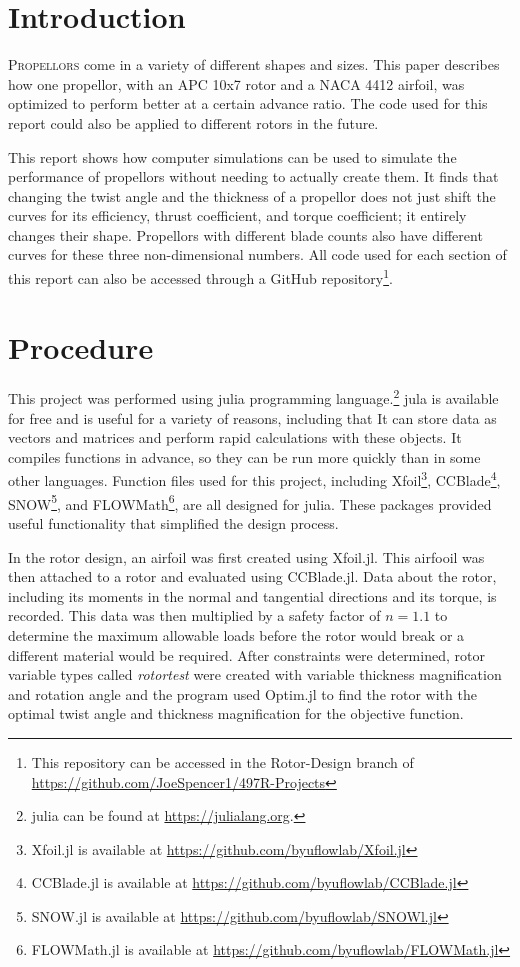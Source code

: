 \documentclass[journal ]{new-aiaa}
\begin{document}
\section{Introduction}

\lettrine{P}{ropellors} come in a variety of different shapes and sizes. This paper describes how one propellor, with an APC 10x7 rotor and a NACA 4412 airfoil, was optimized to perform better at a certain advance ratio. The code used for this report could also be applied to different rotors in the future.

This report shows how computer simulations can be used to simulate the performance of propellors without needing to actually create them. It finds that changing the twist angle and the thickness of a propellor does not just shift the curves for its efficiency, thrust coefficient, and torque coefficient; it entirely changes their shape. Propellors with different blade counts also have different curves for these three non-dimensional numbers. All code used for each section of this report can also be accessed through a GitHub repository\footnote{This repository can be accessed in the Rotor-Design branch of \url{https://github.com/JoeSpencer1/497R-Projects}}.


\section{Procedure}

This project was performed using julia programming language.\footnote{julia can be found at \url{https://julialang.org}.} jula is available for free and is useful for a variety of reasons, including that It can store data as vectors and matrices and perform rapid calculations with these objects. It compiles functions in advance, so they can be run more quickly than in some other languages. Function files used for this project, including Xfoil\footnote{Xfoil.jl is available at \url{https://github.com/byuflowlab/Xfoil.jl}}, CCBlade\footnote{CCBlade.jl is available at \url{https://github.com/byuflowlab/CCBlade.jl}}, SNOW\footnote{SNOW.jl is available at \url{https://github.com/byuflowlab/SNOWl.jl}}, and FLOWMath\footnote{FLOWMath.jl is available at \url{https://github.com/byuflowlab/FLOWMath.jl}}, are all designed for julia. These packages provided useful functionality that simplified the design process.

In the rotor design, an airfoil was first created using Xfoil.jl. This airfooil was then attached to a rotor and evaluated using CCBlade.jl. Data about the rotor, including its moments in the normal and tangential directions and its torque, is recorded. This data was then multiplied by a safety factor of $n=1.1$ to determine the maximum allowable loads before the rotor would break or a different material would be required. After constraints were determined, rotor variable types called \emph{rotortest} were created with variable thickness magnification and rotation angle and the program used Optim.jl to find the rotor with the optimal twist angle and thickness magnification for the objective function.
\end{document}
